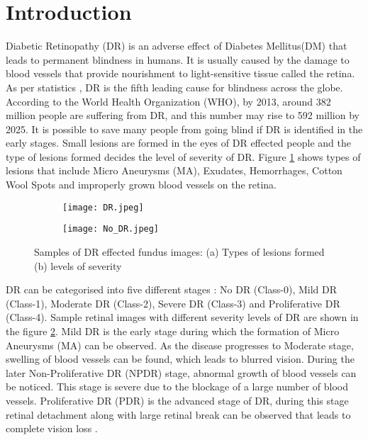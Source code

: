 \documentclass[electronics,article,accept ,moreauthors,pdftex]{mdpi}
\begin{document}


\section{Introduction}
Diabetic Retinopathy (DR) is an adverse effect of Diabetes Mellitus(DM) \cite{cheung2008retinal} that leads to permanent blindness in humans. It is usually caused by the damage to blood vessels that provide nourishment to light-sensitive tissue called the retina. As per statistics \cite{flaxmanglobal}, DR is the fifth leading cause for blindness across the globe. According to the World Health Organization (WHO), by 2013, around 382 million people are  suffering from DR, and this number may rise to 592 million by 2025. It is possible to save many people from going blind if DR is identified in the early stages. Small lesions are formed in the eyes of DR effected people and the type of lesions formed decides the level of severity of DR. Figure \ref{fig:DR} shows  types of lesions that include Micro Aneurysms (MA), Exudates, Hemorrhages, Cotton Wool Spots and improperly grown blood vessels on the retina. 

\begin{figure*}[t!]
    \centering
    \label{DR_image}
    \begin{subfigure}[t]{0.5\textwidth}
        \centering
        \texttt{[image: DR.jpeg]}
        \caption{}
        \label{fig:DR}
    \end{subfigure}%
    \begin{subfigure}[t]{0.5\textwidth}
        \centering     \texttt{[image: No\_DR.jpeg]}     \caption{}
        \label{fig:nodr}
    \end{subfigure}
    \caption{Samples of DR effected fundus images: (a)  Types of lesions formed (b) levels of severity}
    \label{fig:dr_severity}
\end{figure*}


DR can be categorised into five different stages \cite{gulshan2016development}:  
No DR (Class-0), Mild DR (Class-1), Moderate DR (Class-2), Severe DR (Class-3) and Proliferative DR (Class-4). Sample retinal images with different severity levels of DR are shown in the figure \ref{fig:nodr}. Mild DR is the early stage during which the formation of Micro Aneurysms (MA) can be observed. As the disease progresses to Moderate stage,  swelling of blood vessels can be found, which leads to blurred vision. During the later  Non-Proliferative DR (NPDR) stage, abnormal growth of blood vessels can be noticed. This stage is severe due to the blockage of a large number of blood vessels. Proliferative DR (PDR) is the advanced stage of DR, during this stage retinal detachment along with large retinal break can be observed that leads to complete vision loss \cite{williams2004epidemiology}. 
\end{document}
